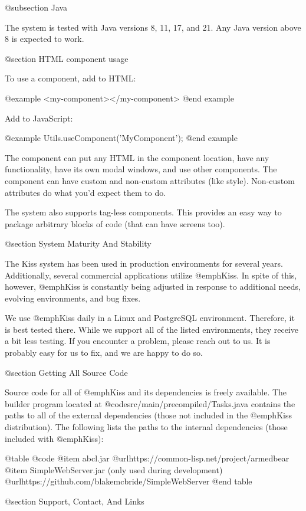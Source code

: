 @subsection Java

The system is tested with Java versions 8, 11, 17, and 21.  Any Java version above 8
is expected to work.



@section HTML component usage
   
To use a component, add to HTML:

@example
<my-component></my-component>
@end example

Add to JavaScript:

@example
Utils.useComponent('MyComponent');
@end example
    
The component can put any HTML in the component location, have any
functionality, have its own modal windows, and use other components.
The component can have custom and non-custom attributes (like style).
Non-custom attributes do what you'd expect them to do.

The system also supports tag-less components.  This provides an easy
way to package arbitrary blocks of code (that can have screens too).

@section System Maturity And Stability

The Kiss system has been used in production environments for several
years.  Additionally, several commercial applications utilize @emph{Kiss}.
In spite of this, however, @emph{Kiss} is constantly being adjusted
in response to additional needs, evolving environments, and bug fixes.

We use @emph{Kiss} daily in a Linux and PostgreSQL environment.
Therefore, it is best tested there.  While we support all of the listed
environments, they receive a bit less testing.  If you encounter a problem,
please reach out to us.  It is probably easy for us to fix, and we
are happy to do so.


@section Getting All Source Code

Source code for all of @emph{Kiss} and its dependencies is freely
available.  The builder program located at
@code{src/main/precompiled/Tasks.java} contains the paths
to all of the external dependencies (those not included in the
@emph{Kiss} distribution).  The following lists the paths to the
internal dependencies (those included with @emph{Kiss}):

@table @code
@item abcl.jar
@url{https://common-lisp.net/project/armedbear}
@item SimpleWebServer.jar (only used during development)
@url{https://github.com/blakemcbride/SimpleWebServer}
@end table

@section Support, Contact, And Links

